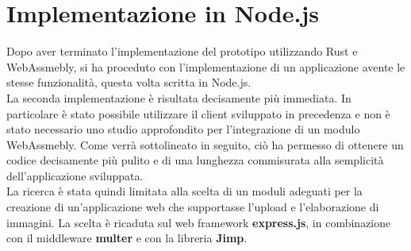 \newpage
\section{Implementazione in Node.js}
Dopo aver terminato l'implementazione del prototipo utilizzando Rust e WebAssmebly, si ha proceduto con l'implementazione di un applicazione avente le stesse funzionalità, questa volta scritta in Node.js.
\\La seconda implementazione è risultata decisamente più immediata.
In particolare è stato possibile utilizzare il client sviluppato in precedenza e non è stato necessario uno studio approfondito per l'integrazione di un modulo WebAssmebly.
Come verrà sottolineato in seguito, ciò ha permesso di ottenere un codice decisamente più pulito e di una lunghezza commisurata alla semplicità dell'applicazione sviluppata.
\\La ricerca è stata quindi limitata alla scelta di un moduli adeguati per la creazione di un'applicazione web che supportasse l'upload e l'elaborazione di immagini.
La scelta è ricaduta sul web framework \textbf{express.js}, in combinazione con il middleware \textbf{multer} e con la libreria \textbf{Jimp}.
